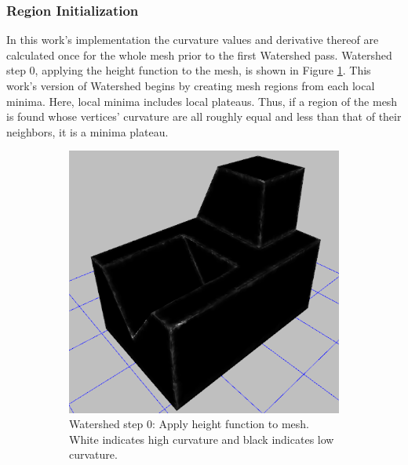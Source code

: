\subsubsection{Region Initialization}
In this work's implementation the curvature values and derivative thereof are calculated once for the whole mesh prior to the first Watershed pass.
Watershed step 0, applying the height function to the mesh, is shown in Figure \ref{sfig:ws_dk}.
This work's version of Watershed begins by creating mesh regions from each local minima.
Here, local minima includes local plateaus.
Thus, if a region of the mesh is found whose vertices' curvature are all roughly equal and less than that of their neighbors, it is a minima plateau.

\begin{figure}[htb]
	\centering
	\begin{subfigure}[t]{0.45\textwidth}
		\centering
		\includegraphics[width=\linewidth]{../resources/watershed/fc028_WS0.png}
		\caption{Watershed step 0: Apply height function to mesh. White indicates high curvature and black indicates low curvature.}
		\label{sfig:ws_dk}
	\end{subfigure}
	\hfill
	\begin{subfigure}[t]{0.45\textwidth}
		\centering

\end{subfigure}
\end{figure}
